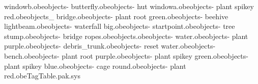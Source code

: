 windowb.obe objects\bank - butterfly.obe objects\bank - hut windowa.obe objects\bank - plant spikey red.obe objects\bank _ bridge.obe objects\bank - plant root green.obe objects\bank - beehive lightbeam.obe objects\bank - waterfall big.obe objects\bank - startpoint.obe objects\bank - tree stump.obe objects\bank - bridge ropes.obe objects\checkpoints.obe objects\bank - water.obe objects\bank - plant purple.obe objects\bank - debris_trunk.obe objects\bank - reset water.obe objects\bank - bench.obe objects\bank - plant root purple.obe objects\bank - plant spikey green.obe objects\bank - plant spikey blue.obe objects\bank - cage round.obe objects\bank - plant red.obe TagTable.pak.sys 